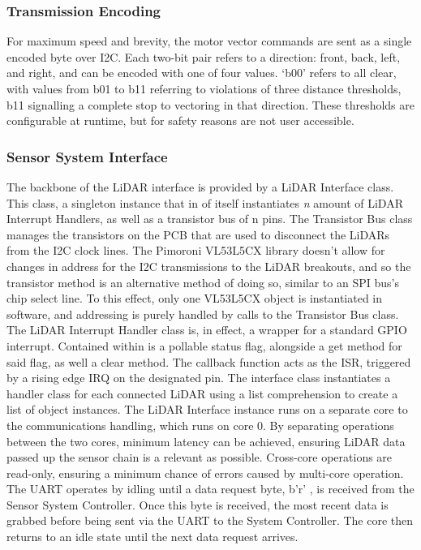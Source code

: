 \documentclass [12pt]{article}
\begin{document}
\subsubsection{Transmission Encoding}
For maximum speed and brevity, the motor vector commands are sent as a single encoded byte over I2C. Each two-bit pair refers to a direction: front, back, left, and right, and can be encoded with one of four values. ‘b00’ refers to all clear, with values from b01 to b11 referring to violations of three distance thresholds, b11 signalling a complete stop to vectoring in that direction. These thresholds are configurable at runtime, but for safety reasons are not user accessible. 
 
\subsubsection{Sensor System Interface}
 

The backbone of the LiDAR interface is provided by a LiDAR Interface class. This class, a singleton instance that in of itself instantiates \textit{n} amount of LiDAR Interrupt Handlers, as well as a transistor bus of n pins.
The Transistor Bus class manages the transistors on the PCB that are used to disconnect the LiDARs from the I2C clock lines. The Pimoroni VL53L5CX library doesn’t allow for changes in address for the I2C transmissions to the LiDAR breakouts, and so the transistor method is an alternative method of doing so, similar to an SPI bus’s chip select line. To this effect, only one VL53L5CX object is instantiated in software, and addressing is purely handled by calls to the Transistor Bus class.
The LiDAR Interrupt Handler class is, in effect, a wrapper for a standard GPIO interrupt. Contained within is a pollable status flag, alongside a get method for said flag, as well a clear method. The callback function acts as the ISR, triggered by a rising edge IRQ on the designated pin. The interface class instantiates a handler class for each connected LiDAR using a list comprehension to create a list of object instances.
The LiDAR Interface instance runs on a separate core to the communications handling, which runs on core 0. By separating operations between the two cores, minimum latency can be achieved, ensuring LiDAR data passed up the sensor chain is a relevant as possible. Cross-core operations are read-only, ensuring a minimum chance of errors caused by multi-core operation.
The UART operates by idling until a data request byte, b’r’ , is received from the Sensor System Controller. Once this byte is received, the most recent data is grabbed before being sent via the UART to the System Controller. The core then returns to an idle state until the next data request arrives.  
 
\end{document}
